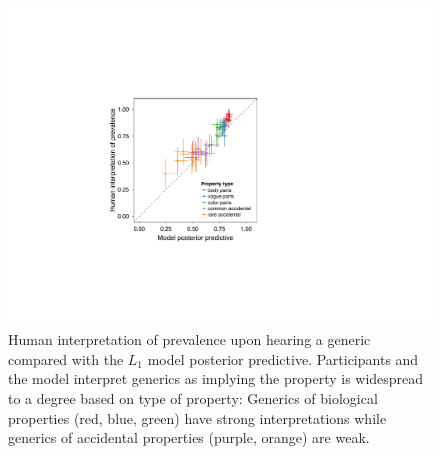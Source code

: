 \documentclass[10pt,letterpaper]{article}
\begin{document}
\begin{figure}
\centering
    \includegraphics[width=0.7\columnwidth]{implied-byItem-mh100kX2b.pdf}
    \caption{Human interpretation of prevalence upon hearing a generic compared with the $L_1$ model posterior predictive. 
    Participants and the model interpret generics as implying the property is widespread to a degree based on type of property: Generics of biological properties (red, blue, green) have  strong interpretations while generics of accidental properties (purple, orange) are weak.}
  \label{fig:impliedByItem}
\end{figure}
\end{document}
